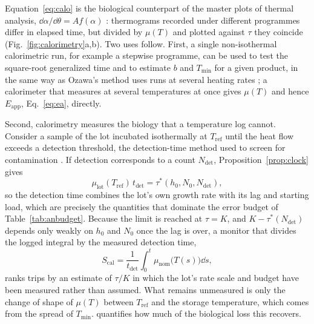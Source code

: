 Equation~\eqref{eq:calo} is the biological counterpart of the master plots of thermal analysis, $\dd\alpha/\dd\theta=Af(\alpha)$ \cite{malek2013,koga2013}: thermograms recorded under different programmes differ in elapsed time, but divided by $\mu(T)$ and plotted against $\tau$ they coincide (Fig.~\ref{fig:calorimetry}a,b). Two uses follow. First, a single non-isothermal calorimetric run, for example a stepwise programme, can be used to test the square-root generalized time and to estimate $b$ and $T_{\min}$ for a given product, in the same way as Ozawa's method uses runs at several heating rates \cite{ozawa1965,koga2013}; a calorimeter that measures at several temperatures at once \cite{wadso2011} gives $\mu(T)$ and hence $E_{\mathrm{app}}$, Eq.~\eqref{eq:ea}, directly.

Second, calorimetry measures the biology that a temperature log cannot. Consider a sample of the lot incubated isothermally at $T_{\mathrm{ref}}$ until the heat flow exceeds a detection threshold, the detection-time method used to screen for contamination \cite{fricke2020}. If detection corresponds to a count $N_{\mathrm{det}}$, Proposition~\ref{prop:clock} gives
\begin{equation}\label{eq:tdet}
\mu_{\mathrm{lot}}(T_{\mathrm{ref}})\,t_{\mathrm{det}}=\tau^*(h_0,N_0,N_{\mathrm{det}}),
\end{equation}
so the detection time combines the lot's own growth rate with its lag and starting load, which are precisely the quantities that dominate the error budget of Table~\ref{tab:anbudget}. Because the limit is reached at $\tau=K$, and $K-\tau^*(N_{\mathrm{det}})$ depends only weakly on $h_0$ and $N_0$ once the lag is over, a monitor that divides the logged integral by the measured detection time,
\begin{equation}\label{eq:cslcal}
S_{\mathrm{cal}}=\frac{1}{t_{\mathrm{det}}}\int_0^t\mu_{\mathrm{nom}}\big(T(s)\big)\dd s ,
\end{equation}
ranks trips by an estimate of $\tau/K$ in which the lot's rate scale and budget have been measured rather than assumed. What remains unmeasured is only the change of shape of $\mu(T)$ between $T_{\mathrm{ref}}$ and the storage temperature, which comes from the spread of $T_{\min}$.  quantifies how much of the biological loss this recovers.


